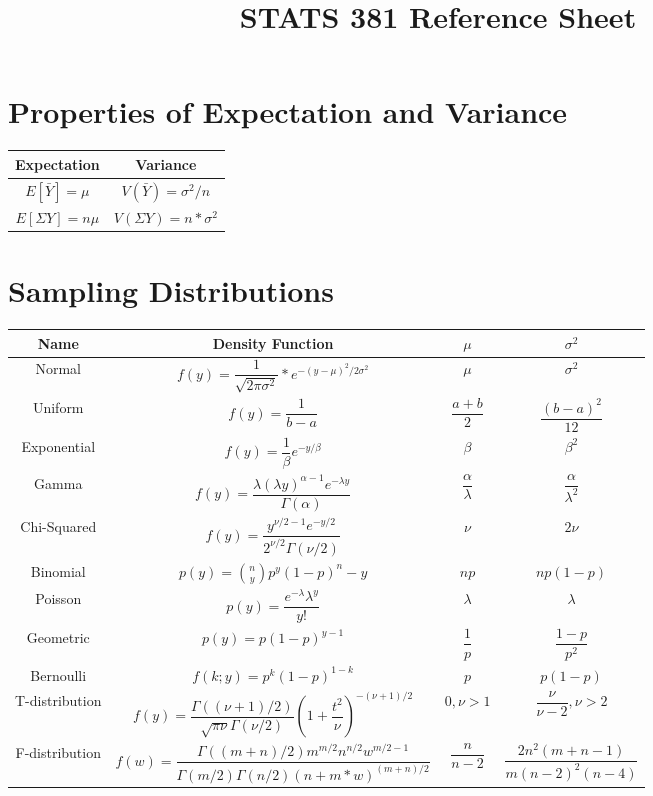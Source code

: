 \documentclass{article}
\title{STATS 381 Reference Sheet}
\begin{document}
\begin{multicols}{2}
\section{Properties of Expectation and Variance}


\begin{tabular} {|c|c|}
\hline
Expectation & Variance \\ \hline
$E[\bar{Y}] =  \mu $ & $V(\bar{Y}) = \sigma^2/n $ \\ \hline
$E[\Sigma Y] = n\mu $ & $V(\Sigma Y) = n*\sigma^2 $ \\ \hline
\end{tabular}

\section{Sampling Distributions}
\begin{tabular}{|c|c|c|c|}
\hline
Name & Density Function & $\mu$  & $\sigma^2$ \\ \hline
Normal & $f(y) = \dfrac{1}{\sqrt{2\pi\sigma^2}}*e^{-(y - \mu)^2 / 2\sigma^2}$ & $\mu$ & $\sigma^2$ \\ \hline
Uniform & $f(y) = \dfrac{1}{b-a}$ & $\dfrac{a+b}{2}$ & $\dfrac{(b-a)^2}{12}$ \\ \hline
Exponential & $f(y) = \dfrac{1}{\beta} e^{-y/\beta}$ & $\beta$ & $\beta^2$ \\ \hline
Gamma & $f(y) = \dfrac{\lambda(\lambda y)^{\alpha-1}e^{-\lambda y}}{\Gamma(\alpha)}$ & $\dfrac{\alpha}{\lambda}$ & $\dfrac{\alpha}{\lambda^2}$ \\ \hline
Chi-Squared & $f(y) = \dfrac{y^{\nu/2-1}e^{-y/2}}{2^{\nu/2}\Gamma(\nu/2)}$ & $\nu$ & $2\nu$ \\ \hline
Binomial & $p(y) = \binom{n}{y} p^y (1-p)^n-y$ & $np$ & $np(1-p)$ \\ \hline
Poisson & $p(y) = \dfrac{e^{-\lambda}\lambda^y}{y!}$ & $\lambda$ & $\lambda$ \\ \hline
Geometric & $p(y) = p(1-p)^{y-1}$ & $\dfrac{1}{p}$ & $\dfrac{1-p}{p^2}$ \\ \hline
Bernoulli & $f(k;y) = p^k(1-p)^{1-k}$ & $p$ & $p(1-p)$ \\ \hline
T-distribution & $f(y) = \dfrac{\Gamma((\nu+1)/2)}{\sqrt{\pi\nu}\Gamma(\nu/2)} (1+\dfrac{t^2}{\nu})^{-(\nu+1)/2}$ & $0, \nu>1$ & $\dfrac{\nu}{\nu-2}, \nu>2$ \\ \hline
F-distribution & $f(w) = \dfrac{\Gamma((m+n)/2)m^{m/2}n^{n/2}w^{m/2-1}}{\Gamma(m/2)\Gamma(n/2)(n+m*w)^{(m+n)/2}}$ & $\dfrac{n}{n-2}$ & $\dfrac{2n^2(m+n-1)}{m(n-2)^2(n-4)}$ \\ \hline

\end{tabular}
\end{multicols}
\end{document}
